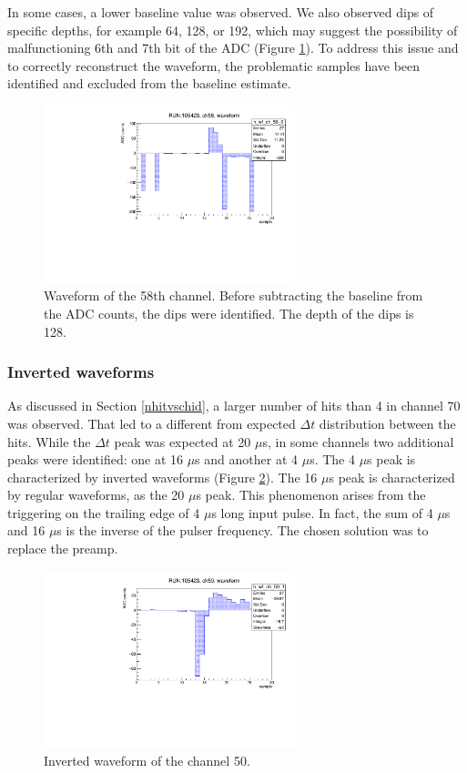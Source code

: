 In some cases, a lower baseline value was observed. 
We also observed dips of specific depths, 
for example 64, 128, or 192, which may suggest the 
possibility of malfunctioning 6th 
and 7th bit of the ADC (Figure \ref{fig:dips}). 
To address this issue and to correctly reconstruct 
the waveform, the problematic samples have been identified and excluded from the baseline estimate.
\begin{figure}[!h]
  \centering
  \includegraphics[width=0.65\textwidth]{figures/pdf/wf_ch58_1.pdf}
  \caption[An example of waveform with dips.]{Waveform of the 58th channel. Before subtracting 
  the baseline from the ADC counts, the dips were identified. The depth of the dips is 128.}
 \label{fig:dips}
\end{figure}
\subsubsection{Inverted waveforms}\label{inv}
As discussed in Section \ref{nhitvschid}, 
a larger number of hits than 4 
in channel 70 was observed. That led to a different from expected $\Delta t$ distribution 
between the hits. 
While the $\Delta t$ peak was expected at 
20 $\mu$s, in some channels two 
additional peaks were identified: 
one at 16 $\mu$s and another at 4 $\mu$s. 
The 4 $\mu$s peak is 
characterized by inverted waveforms 
(Figure \ref{fig:inverted}). 
The 16 $\mu$s peak is characterized 
by regular waveforms, as the 20 $\mu$s peak.
This phenomenon arises from the triggering 
on the trailing edge of 4 $\mu$s long input pulse.  
In fact, the sum of 4 $\mu$s and 16 $\mu$s 
is the inverse of the pulser frequency. 
The chosen solution was to replace the preamp. 
\begin{figure}[!h]
  \centering
  \includegraphics[width=0.65\textwidth]{figures/pdf/wf_ch50_1.pdf}
  \caption[An inverted waveform.]{Inverted waveform of the channel 50.}
 \label{fig:inverted}
\end{figure}
